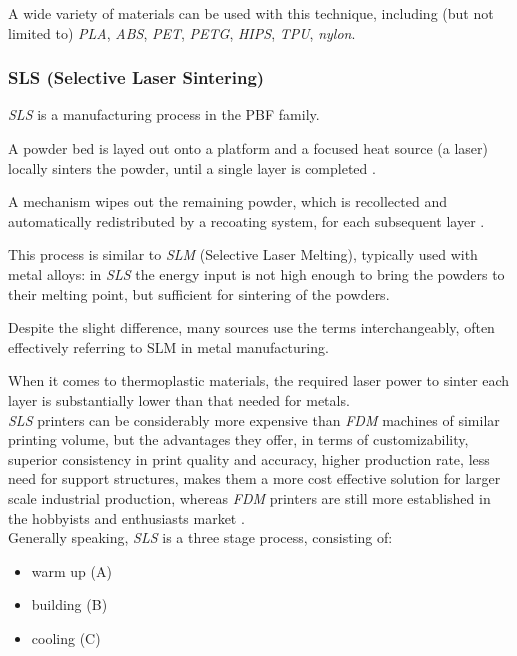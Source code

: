 \documentclass{article}
\begin{document}
    A wide variety of materials can be used with this technique, including (but not limited to) 
    \textit{PLA}, \textit{ABS}, \textit{PET}, \textit{PETG}, \textit{HIPS}, \textit{TPU}, \textit{nylon}. \clearpage

    \subsubsection{SLS (Selective Laser Sintering) \label{SLS_general}}

    \textit{SLS} is a manufacturing process in the PBF family. 

    A powder bed is layed out onto a platform and a focused heat source (a laser) locally sinters the powder, 
    until a single layer is completed \autocites*{Recent_progress_polymers_AM}{Kovalcik_PHA_Review}. 

    A mechanism wipes out the remaining powder, which is recollected and automatically redistributed by a recoating 
    system, for each subsequent layer \autocite*{Padovano_SLS_Review}. 

    This process is similar to \textit{SLM} (Selective Laser Melting), typically used with metal alloys: in \textit{SLS} the energy input is not high enough 
    to bring the powders to their melting point, but sufficient for sintering of the powders. 

    Despite the slight difference, many sources use the terms interchangeably, often effectively referring to SLM in metal manufacturing. 
    
    When it comes to thermoplastic materials, the required laser power to sinter each layer is substantially lower than that needed for metals. \\ 

    \textit{SLS} printers can be considerably more expensive than \textit{FDM} machines of similar printing volume, but the advantages they offer, 
    in terms of customizability, superior consistency in print quality and accuracy, higher production rate, less need for support structures, 
    makes them a more cost effective solution for larger scale industrial production, whereas \textit{FDM} printers are still more established 
    in the hobbyists and enthusiasts market \autocite*{Padovano_SLS_Review}. \\ 

    Generally speaking, \textit{SLS} is a three stage process, consisting of: 
    
    \begin{itemize}
        \item warm up (A)
        \item building (B)
        \item cooling (C)
    \end{itemize}
\end{document}
